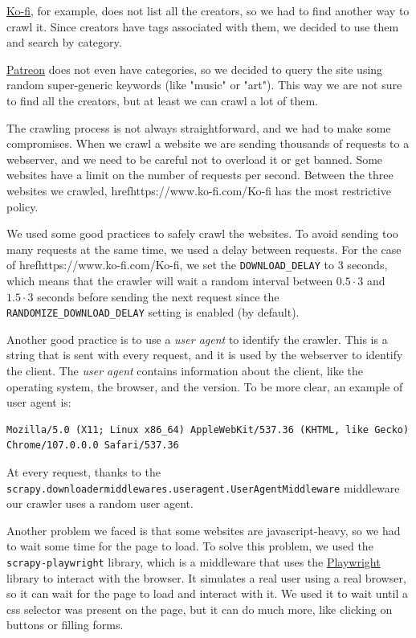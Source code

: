 \documentclass[tikz,14pt]{article}
\begin{document}
\href{https://www.ko-fi.com/}{Ko-fi}, for example, does not list all the creators, so we had to find another way to crawl it.
Since creators have tags associated with them, we decided to use them and search by category.

\href{https://www.patreon.com/}{Patreon} does not even have categories, 
so we decided to query the site using random super-generic keywords (like "music" or "art").
This way we are not sure to find all the creators, but at least we can crawl a lot of them.

The crawling process is not always straightforward, and we had to make some compromises.
When we crawl a website we are sending thousands of requests to a webserver, and we need to be careful not to overload it or get banned.
Some websites have a limit on the number of requests per second.
Between the three websites we crawled, href{https://www.ko-fi.com/}{Ko-fi} has the most restrictive policy.

We used some good practices to safely crawl the websites. To avoid sending too many requests at the same time, we used a delay between requests.
For the case of href{https://www.ko-fi.com/}{Ko-fi}, we set the \texttt{DOWNLOAD_DELAY} to 3 seconds,
which means that the crawler will wait a random interval between $0.5 \cdot 3$ and $1.5 \cdot 3$ seconds 
before sending the next request since the \texttt{RANDOMIZE_DOWNLOAD_DELAY} setting is enabled (by default).

Another good practice is to use a \textit{user agent} to identify the crawler.
This is a string that is sent with every request, and it is used by the webserver to identify the client.
The \textit{user agent} contains information about the client, like the operating system, the browser, and the version.
To be more clear, an example of user agent is: 
\begin{verbatim}
Mozilla/5.0 (X11; Linux x86_64) AppleWebKit/537.36 (KHTML, like Gecko) Chrome/107.0.0.0 Safari/537.36
\end{verbatim}
At every request, thanks to the \texttt{scrapy.downloadermiddlewares.useragent.UserAgentMiddleware} middleware
our crawler uses a random user agent.

Another problem we faced is that some websites are javascript-heavy, so we had to wait some time for the page to load.
To solve this problem, we used the \verb|scrapy-playwright| library, which is a middleware that uses the \href{https://playwright.dev/}{Playwright} library to interact with the browser.
It simulates a real user using a real browser, so it can wait for the page to load and interact with it. 
We used it to wait until a css selector was present on the page, but it can do much more, like clicking on buttons or filling forms.
\end{document}
